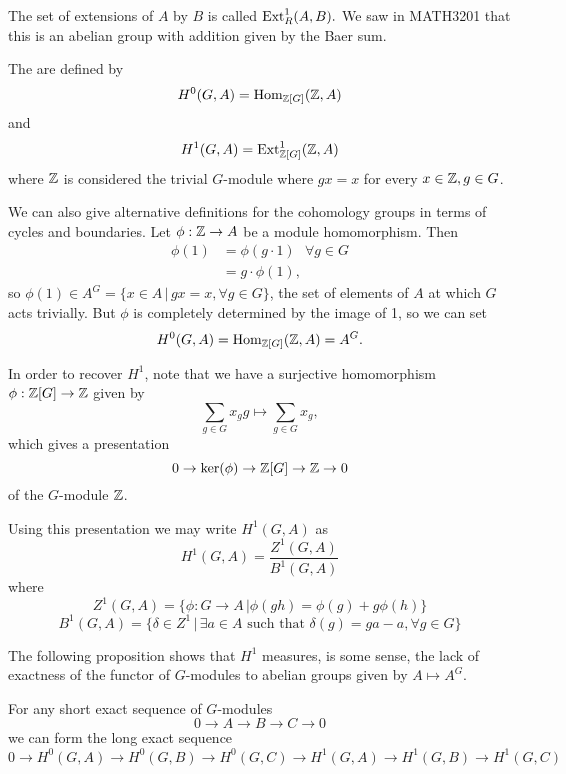 \documentclass[12pt, a4paper]{report}
\begin{document}
The set of extensions of $A$ by $B$ is called $\textnormal{Ext}^1_R (A,B).$ We saw in
MATH3201 that this is an abelian group with addition given by the Baer sum.

\begin{defn}
  The  are defined by
  \[H^0 (G, A) = \textnormal{Hom}_{{\mathbb Z}[G]}({\mathbb Z}, A)\] and
  \[H^1 (G, A) = \textnormal{Ext}^1_{{\mathbb Z}[G]} ({\mathbb Z}, A)\] where ${\mathbb Z}$ is considered the
  trivial $G$-module where $g x = x$ for every $x \in {\mathbb Z}, g \in G$. 
\end{defn}

We can also give alternative definitions for the cohomology groups in terms of
cycles and boundaries.
Let $\phi : {\mathbb Z} \rightarrow A$ be a module homomorphism. Then
\[\begin{split} \phi(1) &= \phi(g \cdot 1) \,\,\,\, \forall g \in G \\
    &= g \cdot \phi(1) , \end{split}\]
so $\phi(1) \in A^G = \{x \in A \, | \, gx = x, \forall g \in G\}$, the set
of elements of $A$ at which $G$ acts trivially. But $\phi$ is
completely determined by the image of 1, so we can set
\[ H^0 (G, A) = \text{Hom}_{{\mathbb Z}[G]}({\mathbb Z}, A) = A^G .\] 

In order to recover $H^1$, note that
we have a surjective homomorphism $\phi: {\mathbb Z}[G] \rightarrow {\mathbb Z}$ given by
\[\sum\limits_{g \in G} x_gg \mapsto \sum\limits_{g \in G} x_g,\]
which gives a presentation
\[0 \rightarrow \text{ker}(\phi) \rightarrow {\mathbb Z}[G] \rightarrow {\mathbb Z} \rightarrow 0\]
of the $G$-module ${\mathbb Z}$. 

Using this presentation we may write $H^1(G,A)$ as 
\[H^1(G, A) = \frac{Z^1(G,A)}{B^1(G,A)}\]
where
\[Z^1(G,A) = \{ \phi : G \rightarrow A \, | \phi(gh) = \phi(g) + g \phi(h)\}\]
\[B^1(G,A) = \{ \delta \in Z^1 \, | \, \exists a \in A \,\,\text{such that}\,\, \delta(g)
  = ga - a , \forall g \in G\}\]

The following proposition shows that $H^1$ measures, is some sense, the lack of
exactness of the functor of $G$-modules to abelian groups given by $A \mapsto A^G.$

\begin{prop}
  For any short exact sequence of $G$-modules
  \[ 0 \rightarrow A \rightarrow B \rightarrow C \rightarrow 0\]
  we can form the long exact sequence
  \[ 0 \rightarrow H^0(G, A) \rightarrow H^0(G,B) \rightarrow H^0(G,C)
    \rightarrow H^1(G, A) \rightarrow H^1(G,B) \rightarrow H^1(G,C) \]
\end{prop}
\end{document}
